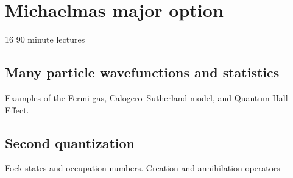 \section{Michaelmas major option}

16 90 minute lectures

\subsection{Many particle wavefunctions and statistics}

Examples of the Fermi gas, Calogero--Sutherland model, and Quantum Hall Effect.

\subsection{Second quantization}

Fock states and occupation numbers. Creation and annihilation operators


